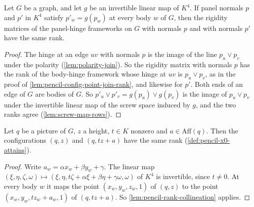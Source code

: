 \begin{lemma}
  \label{lem:pencil-rank-collineation}
  \leanok
  Let $G$ be a graph, and let $g$ be an invertible linear map of $K^4$.
  If panel normals $p$ and $p'$ in $K^4$ satisfy $p'_w = g(p_w)$ at every
  body $w$ of $G$, then the rigidity matrices of the panel-hinge
  frameworks on $G$ with normals $p$ and with normals $p'$ have the same
  rank.
\end{lemma}
\begin{proof}
  \leanok
  The hinge at an edge $uv$ with normals $p$ is the image of the line
  $p_u \vee p_v$ under the polarity
  (\cref{lem:polarity-join}). So the rigidity matrix with
  normals $p$ has the rank of the body-hinge framework whose hinge at
  $uv$ is $p_u \vee p_v$, as in the proof of
  \cref{lem:pencil-config-point-join-rank}, and likewise for $p'$. Both
  ends of an edge of $G$ are bodies of $G$. So
  $p'_u \vee p'_v = g(p_u) \vee g(p_v)$ is the image of
  $p_u \vee p_v$ under the invertible linear map of the screw space
  induced by $g$, and the two ranks agree (\cref{lem:screw-map-rows}).
\end{proof}

\begin{lemma}
  \label{lem:pencil-rank-scale-shift}
  \leanok
  Let $q$ be a picture of $G$, $z$ a height, $t \in K$ nonzero and
  $a \in \mathrm{Aff}(q)$. Then the configurations $(q, z)$ and
  $(q, tz + a)$ have the same rank (\cref{def:pencil-x0-attains}).
\end{lemma}
\begin{proof}
  \leanok
  Write $a_w = \alpha x_w + \beta y_w + \gamma$. The linear map
  $(\xi, \eta, \zeta, \omega) \mapsto
  (\xi, \eta, t\zeta + \alpha\xi + \beta\eta + \gamma\omega, \omega)$ of
  $K^4$ is invertible, since $t \neq 0$. At every body $w$ it maps the
  point $(x_w, y_w, z_w, 1)$ of $(q, z)$ to the point
  $(x_w, y_w, t z_w + a_w, 1)$ of $(q, tz + a)$. So
  \cref{lem:pencil-rank-collineation} applies.
\end{proof}

